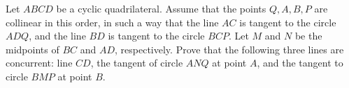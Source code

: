 Let $ABCD$ be a cyclic quadrilateral. Assume that the points $Q, A, B, P$ are collinear in this order, in such a way that the line $AC$ is tangent to the circle $ADQ$, and the line $BD$ is tangent to the circle $BCP$. Let $M$ and $N$ be the midpoints of $BC$ and $AD$, respectively. Prove that the following three lines are concurrent: line $CD$, the tangent of circle $ANQ$ at point $A$, and the tangent to circle $BMP$ at point $B$.
